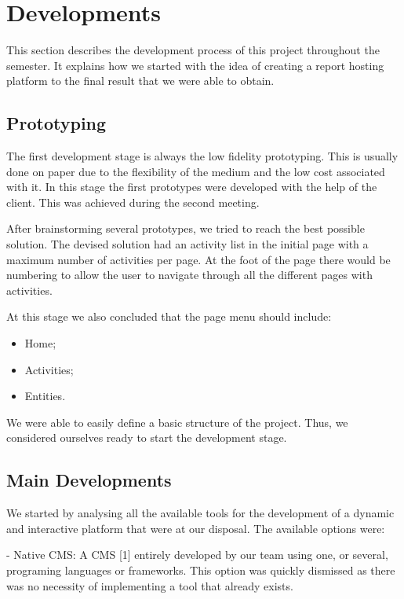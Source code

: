 \documentclass[a4paper,12pt,journal,twoside,compsoc]{PPIEEEtran}
\begin{document}

\section{Developments}

This section describes the development process of this project throughout the semester. It explains how we started with the idea of creating a report hosting platform to the final result that we were able to obtain.

\subsection{Prototyping}

The first development stage is always the low fidelity prototyping. This is usually done on paper due to the flexibility of the medium and the low cost associated with it. In this stage the first prototypes were developed with the help of the client. This was achieved during the second meeting.

After brainstorming several prototypes, we tried to reach the best possible solution. The devised solution had an activity list in the initial page with a maximum number of activities per page. At the foot of the page there would be numbering to allow the user to navigate through all the different pages with activities.

At this stage we also concluded that the page menu should include:
\begin{itemize}
	\item Home;
	\item Activities;
	\item Entities.
\end{itemize}

We were able to easily define a basic structure of the project. Thus, we considered ourselves ready to start the development stage.

\subsection{Main Developments}

We started by analysing all the available tools for the development of a dynamic and interactive platform that were at our disposal. The available options were:

- Native \ac{CMS}: A \ac{CMS} [1] entirely developed by our team using one, or several, programing languages or frameworks. This option was quickly dismissed as there was no necessity of implementing a tool that already exists.
\end{document}
